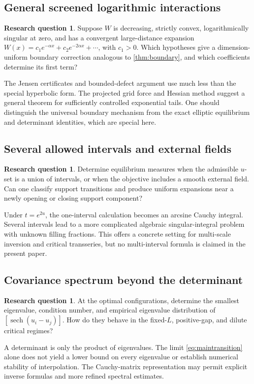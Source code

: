 \documentclass[11pt,a4paper]{article}
\theoremstyle{definition}
\newtheorem{question}[theorem]{Research question}
\theoremstyle{remark}
\newcommand{\sech}{\operatorname{sech}}
\begin{document}
\subsection{General screened logarithmic interactions}
\begin{question}
Suppose $W$ is decreasing, strictly convex, logarithmically singular at
zero, and has a convergent large-distance expansion
$W(x)=c_1e^{-\alpha x}+c_2e^{-2\alpha x}+\cdots$, with $c_1>0$.
Which hypotheses give a dimension-uniform boundary correction analogous
to \cref{thm:boundary}, and which coefficients determine its first term?
\end{question}
The Jensen certificates and bounded-defect argument use much less than
the special hyperbolic form. The projected grid force and Hessian method
suggest a general theorem for sufficiently controlled exponential tails.
One should distinguish the universal boundary mechanism from the exact
elliptic equilibrium and determinant identities, which are special here.

\subsection{Several allowed intervals and external fields}
\begin{question}
Determine equilibrium measures when the admissible $u$-set is a union of
intervals, or when the objective includes a smooth external field. Can
one classify support transitions and produce uniform expansions near a
newly opening or closing support component?
\end{question}
Under $t=e^{2u}$, the one-interval calculation becomes an arcsine Cauchy
integral. Several intervals lead to a more complicated algebraic
singular-integral problem with unknown filling fractions. This offers a
concrete setting for multi-scale inversion and critical transseries,
but no multi-interval formula is claimed in the present paper.

\subsection{Covariance spectrum beyond the determinant}
\begin{question}
At the optimal configurations, determine the smallest eigenvalue,
condition number, and empirical eigenvalue distribution of
$[\sech(u_i-u_j)]$. How do they behave in the fixed-$L$, positive-gap,
and dilute critical regimes?
\end{question}
A determinant is only the product of eigenvalues. The limit
\eqref{eq:maintransition} alone does not yield a lower bound on every
eigenvalue or establish numerical stability of interpolation. The
Cauchy-matrix representation may permit explicit inverse formulas and
more refined spectral estimates.
\end{document}
